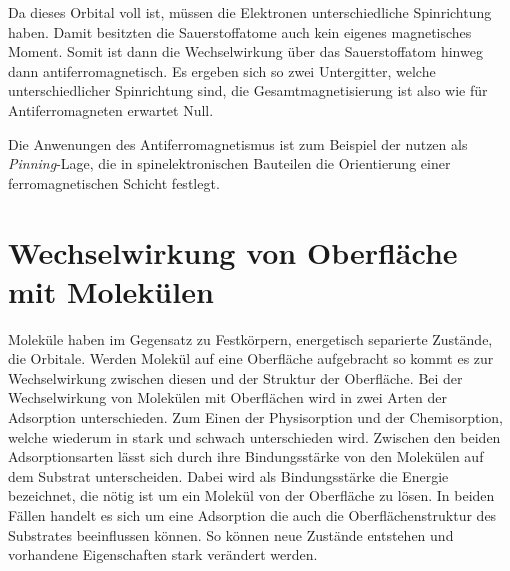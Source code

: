         Da dieses Orbital voll ist, müssen die Elektronen unterschiedliche Spinrichtung haben.
        Damit besitzten die Sauerstoffatome auch kein eigenes magnetisches Moment.
        Somit ist dann die Wechselwirkung über das Sauerstoffatom hinweg dann antiferromagnetisch.
        Es ergeben sich so zwei Untergitter, welche unterschiedlicher Spinrichtung sind, die Gesamtmagnetisierung ist also wie für Antiferromagneten erwartet Null.
        
        Die Anwenungen des Antiferromagnetismus ist zum Beispiel der nutzen als \textit{Pinning}-Lage, die in spinelektronischen Bauteilen die Orientierung einer ferromagnetischen Schicht festlegt.
        
            
    
    \section{Wechselwirkung von Oberfläche mit Molekülen}
        Moleküle haben im Gegensatz zu Festkörpern, energetisch separierte Zustände, die Orbitale.
        Werden Molekül auf eine Oberfläche aufgebracht so kommt es zur Wechselwirkung zwischen diesen und der Struktur der Oberfläche.
        Bei der Wechselwirkung von Molekülen mit Oberflächen wird in zwei Arten der Adsorption unterschieden. 
        Zum Einen der Physisorption und der Chemisorption, welche wiederum in stark und schwach unterschieden wird.
        Zwischen den beiden Adsorptionsarten lässt sich durch ihre Bindungsstärke von den Molekülen auf dem Substrat unterscheiden.
        Dabei wird als Bindungsstärke die Energie bezeichnet, die nötig ist um ein Molekül von der Oberfläche zu lösen.
        In beiden Fällen handelt es sich um eine Adsorption die auch die Oberflächenstruktur des Substrates beeinflussen können.
        So können neue Zustände entstehen und vorhandene Eigenschaften stark verändert werden.
        
